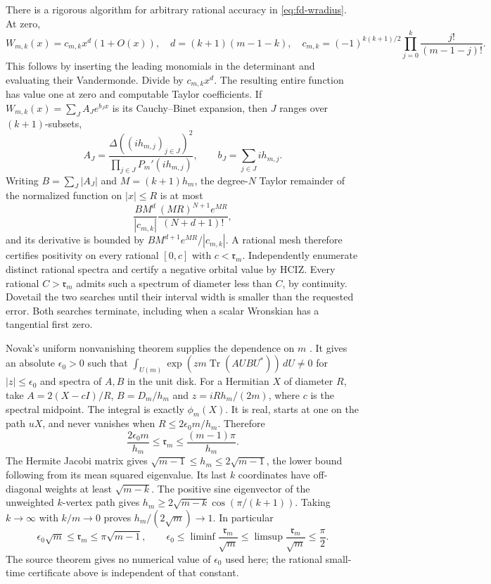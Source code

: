 There is a rigorous algorithm for arbitrary rational accuracy in
\eqref{eq:fd-wradius}.  At zero,
\[
 W_{m,k}(x)=c_{m,k}x^{d}(1+O(x)),\quad
 d=(k+1)(m-1-k),\quad
 c_{m,k}=(-1)^{k(k+1)/2}\prod_{j=0}^k\frac{j!}{(m-1-j)!}.
\]
This follows by inserting the leading monomials in the determinant
and evaluating their Vandermonde.  Divide by $c_{m,k}x^d$.
The resulting entire function has value one at zero and computable
Taylor coefficients.  If
$W_{m,k}(x)=\sum_J A_Je^{b_Jx}$ is its Cauchy--Binet expansion,
then $J$ ranges over $(k+1)$-subsets,
\[
 A_J=\frac{\Delta((ih_{m,j})_{j\in J})^2}
             {\prod_{j\in J}P_m'(ih_{m,j})},\qquad
 b_J=\sum_{j\in J}ih_{m,j}.
\]
Writing $B=\sum_J|A_J|$ and $M=(k+1)h_m$, the degree-$N$
Taylor remainder of the normalized function on $|x|\le R$ is at most
\[
 \frac{BM^d}{|c_{m,k}|}
      \frac{(MR)^{N+1}e^{MR}}{(N+d+1)!},
\]
and its derivative is bounded by
$BM^{d+1}e^{MR}/|c_{m,k}|$.
A rational mesh therefore certifies positivity on every rational
$[0,c]$ with $c<\mathfrak r_m$.
Independently enumerate distinct rational spectra and certify a
negative orbital value by HCIZ.  Every rational
$C>\mathfrak r_m$ admits such a spectrum of diameter less than $C$,
by continuity.  Dovetail the two searches until their interval width
is smaller than the requested error.  Both searches terminate, including
when a scalar Wronskian has a tangential first zero.

Novak's uniform nonvanishing theorem supplies the dependence on $m$
\cite[Theorem~1.2, p.~6]{Novak2022}.  It gives an absolute
$\epsilon_0>0$ such that
$\int_{U(m)}\exp(zm\operatorname{Tr}(AUBU^*))\,dU\ne0$
for $|z|\le\epsilon_0$ and spectra of $A,B$ in the unit disk.
For a Hermitian $X$ of diameter $R$, take
$A=2(X-cI)/R$, $B=D_m/h_m$ and $z=iRh_m/(2m)$,
where $c$ is the spectral midpoint.  The integral is exactly $\phi_m(X)$.
It is real, starts at one on the path $uX$, and never vanishes when
$R\le2\epsilon_0m/h_m$.  Therefore
\[
 \frac{2\epsilon_0m}{h_m}\le\mathfrak r_m
                 \le\frac{(m-1)\pi}{h_m}.
\]
The Hermite Jacobi matrix gives
$\sqrt{m-1}\le h_m\le2\sqrt{m-1}$, the lower bound following
from its mean squared eigenvalue.
Its last $k$ coordinates have off-diagonal weights at least
$\sqrt{m-k}$.  The positive sine eigenvector of the unweighted
$k$-vertex path gives
$h_m\ge2\sqrt{m-k}\cos(\pi/(k+1))$.
Taking $k\to\infty$ with $k/m\to0$ proves $h_m/(2\sqrt m)\to1$.
In particular
\[
 \epsilon_0\sqrt m\le\mathfrak r_m\le\pi\sqrt{m-1},\qquad
 \epsilon_0\le\liminf\frac{\mathfrak r_m}{\sqrt m}
 \le\limsup\frac{\mathfrak r_m}{\sqrt m}\le\frac\pi2.
\]
The source theorem gives no numerical value of $\epsilon_0$ used here;
the rational small-time certificate above is independent of that constant.
